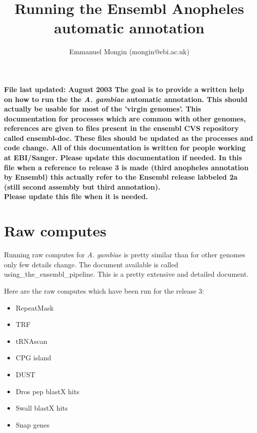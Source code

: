 \documentclass[a4paper,10pt]{article}
\title{Running the Ensembl Anopheles automatic annotation}
\author{Emmanuel Mongin (mongin@ebi.ac.uk)}
\begin{document}
\maketitle


\bf{File last updated: August 2003}
The goal is to provide a written help on how to run the the \textit{A. gambiae} automatic annotation. This should actually be usable for most of the 'virgin genomes'. This documentation for processes which are common with other genomes, references are given to files present in the ensembl CVS repository called ensembl-doc. These files should be updated as the processes and code change. All of this documentation is written for people working at EBI/Sanger. Please update this documentation if needed. In this file when a reference to release 3 is made (third anopheles annotation by Ensembl) this actually refer to the Ensembl release labbeled 2a (still second assembly but third annotation).\\
\bf{Please update this file when it is needed.}

\section{Raw computes}
Running raw computes for \textit{A. gambiae} is pretty similar than for other genomes only few details change.
The document available is called using\_the\_ensembl\_pipeline. This is a pretty extensive and detailed document.

Here are the raw computes which have been run for the release 3:
\begin{itemize}
\item RepeatMask
\item TRF
\item tRNAscan
\item CPG island
\item DUST
\item Dros pep blastX hits
\item Swall blastX hits
\item Snap genes
\end{itemize}
\end{document}
